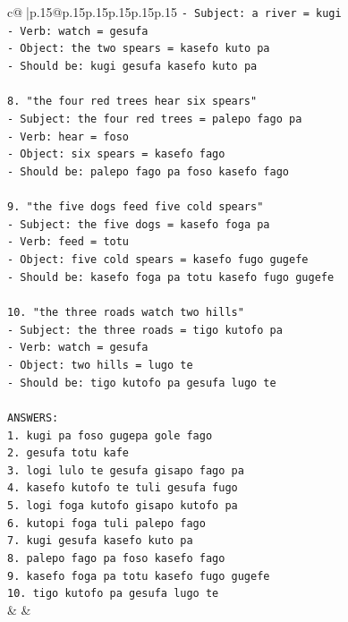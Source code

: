 \documentclass{article}
\begin{document}
{\begin{supertabular}{c@{$\;$}|p{.15\linewidth}@{}p{.15\linewidth}p{.15\linewidth}p{.15\linewidth}p{.15\linewidth}p{.15\linewidth}}
{{{\texttt{{-} Subject: a river = kugi} \\
\texttt{{-} Verb: watch = gesufa} \\
\texttt{{-} Object: the two spears = kasefo kuto pa} \\
\texttt{{-} Should be: kugi gesufa kasefo kuto pa} \\
\\ 
\texttt{8. "the four red trees hear six spears"} \\
\texttt{{-} Subject: the four red trees = palepo fago pa} \\
\texttt{{-} Verb: hear = foso} \\
\texttt{{-} Object: six spears = kasefo fago} \\
\texttt{{-} Should be: palepo fago pa foso kasefo fago} \\
\\ 
\texttt{9. "the five dogs feed five cold spears"} \\
\texttt{{-} Subject: the five dogs = kasefo foga pa} \\
\texttt{{-} Verb: feed = totu} \\
\texttt{{-} Object: five cold spears = kasefo fugo gugefe} \\
\texttt{{-} Should be: kasefo foga pa totu kasefo fugo gugefe} \\
\\ 
\texttt{10. "the three roads watch two hills"} \\
\texttt{{-} Subject: the three roads = tigo kutofo pa} \\
\texttt{{-} Verb: watch = gesufa} \\
\texttt{{-} Object: two hills = lugo te} \\
\texttt{{-} Should be: tigo kutofo pa gesufa lugo te} \\
\\ 
\texttt{ANSWERS:} \\
\texttt{1. kugi pa foso gugepa gole fago} \\
\texttt{2. gesufa totu kafe} \\
\texttt{3. logi lulo te gesufa gisapo fago pa} \\
\texttt{4. kasefo kutofo te tuli gesufa fugo} \\
\texttt{5. logi foga kutofo gisapo kutofo pa} \\
\texttt{6. kutopi foga tuli palepo fago} \\
\texttt{7. kugi gesufa kasefo kuto pa} \\
\texttt{8. palepo fago pa foso kasefo fago} \\
\texttt{9. kasefo foga pa totu kasefo fugo gugefe} \\
\texttt{10. tigo kutofo pa gesufa lugo te} \\
            }
        }
    }
    & & \\ \\


\end{supertabular}}
\end{document}
